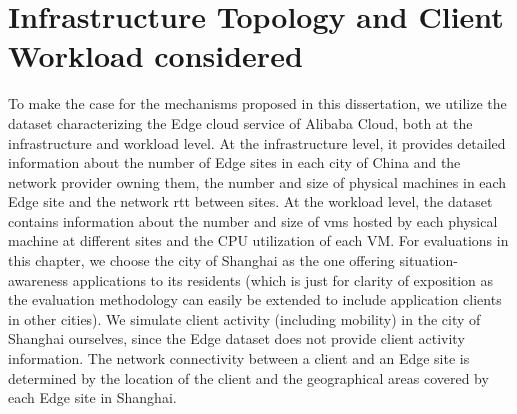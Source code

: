 \section{Infrastructure Topology and Client Workload considered}
\label{sec:nep_infra_topology}
\par To make the case for the mechanisms proposed in this dissertation, we utilize the dataset \cite{xu2021cloud} characterizing the Edge cloud service of Alibaba Cloud, both at the infrastructure and workload level. At the infrastructure level, it provides detailed information about the number of Edge sites in each city of China and the network provider owning them, the number and size of physical machines in each Edge site and the network \gls{rtt} between sites. At the workload level, the dataset contains information about the number and size of \glspl{vm} hosted by each physical machine at different sites and the CPU utilization of each VM. For evaluations in this chapter, we choose the city of Shanghai as the one offering situation-awareness applications to its residents (which is just for clarity of exposition as the evaluation methodology can easily be extended to include application clients in other cities). We simulate client activity (including mobility) in the city of Shanghai ourselves, since the Edge dataset \cite{xu2021cloud} does not provide client activity information. The network connectivity between a client and an Edge site is determined by the location of the client and the geographical areas covered by each Edge site in Shanghai.
